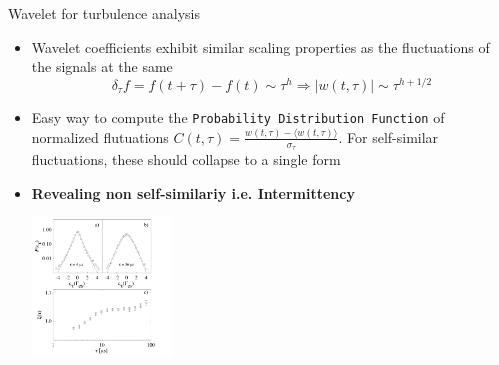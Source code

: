 \documentclass[t,10pt]{beamer}
\begin{document}
\begin{frame}{Wavelet for turbulence analysis}

 \begin{itemize}[<+->]
  \item Wavelet coefficients exhibit similar
    scaling properties as the fluctuations of the signals at the same
\begin{equation*}
\delta_{\tau} f = f(t+\tau)-f(t) \sim \tau^h \Rightarrow |w(t,\tau)|\sim\tau^{h+1/2}
\end{equation*}
\item Easy way to compute the
  \textcolor{tachameleon}{\texttt{Probability Distribution Function}}
  of normalized flutuations $C(t,\tau)=\frac{w(t,\tau)-\langle
    w(t,\tau)\rangle}{\sigma_{\tau}}$. For
  \textcolor{taskyblue}{self-similar} fluctuations, these should
  collapse to a single form

\item \textcolor{tascarletred}{\textbf{Revealing non
      self-similariy i.e. Intermittency}}

\begin{center}
\includegraphics[height=3.7cm]{pdf_fluct}
\end{center}

\end{itemize}
\end{frame}

\end{document}
